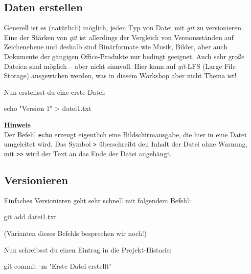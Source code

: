 \documentclass[
  ngerman,
  letterpaper,
  DIV=11]{scrreprt}
\newenvironment{Shaded}{\begin{snugshade}}{\end{snugshade}}
\newcommand{\AttributeTok}[1]{\textcolor[rgb]{0.40,0.45,0.13}{#1}}
\newcommand{\BuiltInTok}[1]{\textcolor[rgb]{0.00,0.23,0.31}{#1}}
\newcommand{\FunctionTok}[1]{\textcolor[rgb]{0.28,0.35,0.67}{#1}}
\newcommand{\NormalTok}[1]{\textcolor[rgb]{0.00,0.23,0.31}{#1}}
\newcommand{\OperatorTok}[1]{\textcolor[rgb]{0.37,0.37,0.37}{#1}}
\newcommand{\StringTok}[1]{\textcolor[rgb]{0.13,0.47,0.30}{#1}}
\newcommand{\git}{\textit{git}\xspace}
\begin{document}
\subsection{Daten erstellen}\label{daten-erstellen}

Generell ist es (natürlich) möglich, jeden Typ von Datei mit \git zu
versionieren. Eine der Stärken von \git ist allerdings der Vergleich von
Versionsständen auf Zeichenebene und deshalb sind Binärformate wie
Musik, Bilder, aber auch Dokumente der gängigen Office-Produkte nur
bedingt geeignet. Auch sehr große Dateien sind möglich -- aber nicht
sinnvoll. Hier kann auf \git-LFS (Large File Storage) ausgewichen
werden, was in diesem Workshop aber nicht Thema ist!

Nun erstellsst du eine erste Datei:

\begin{Shaded}
\begin{Highlighting}[]
\BuiltInTok{echo} \StringTok{"Version 1"} \OperatorTok{\textgreater{}}\NormalTok{ datei1.txt}
\end{Highlighting}
\end{Shaded}

\samplestart

\textbf{Hinweis}\\
Der Befehl \texttt{echo} erzeugt eigentlich eine Bildschirmausgabe, die
hier in eine Datei umgeleitet wird. Das Symbol \texttt{\textgreater{}}
überschreibt den Inhalt der Datei ohne Warnung, mit
\texttt{\textgreater{}\textgreater{}} wird der Text an das Ende der
Datei angehängt. \sampleend

\subsection{Versionieren}\label{versionieren}

Einfaches Versionieren geht sehr schnell mit folgendem Befehl:

\begin{Shaded}
\begin{Highlighting}[]
\FunctionTok{git}\NormalTok{ add datei1.txt }
\end{Highlighting}
\end{Shaded}

(Varianten dieses Befehls besprechen wir noch!)

Nun schreibsst du einen Eintrag in die Projekt-Historie:

\begin{Shaded}
\begin{Highlighting}[]
\FunctionTok{git}\NormalTok{ commit }\AttributeTok{{-}m} \StringTok{"Erste Datei erstellt"}
\end{Highlighting}
\end{Shaded}
\end{document}
